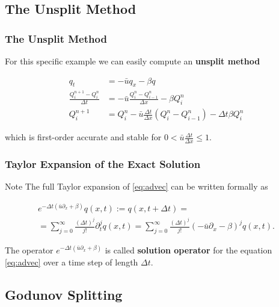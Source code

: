\documentclass{beamer}
\renewcommand{\d}{\Delta}
\newcommand{\emp}[1]{\textcolor{tum}{\textbf{#1}}}
\begin{document}
\subsection{The Unsplit Method}

\begin{frame}
	\frametitle{The Unsplit Method}
	For this specific example we can easily compute an \emp{unsplit method}

	\begin{align*}\label{eq:unsplit}
		q_t                          & = -\bar{u}q_x-\beta q                                              \\
		\frac{Q^{n+1}_i-Q^n_i}{\d t} & = -\bar{u} \frac{Q^n_i-Q^n_{i-1}}{\d x}-\beta Q^n_i                \\
		Q^{n+1}_i                    & = Q^n_i-\bar{u} \frac{\d t}{\d x}(Q^n_i-Q^n_{i-1})-\d t\beta Q^n_i
	\end{align*}

	which is first-order accurate and stable for $0<\bar{u}\frac{\d t}{\d x}\leq1$.
\end{frame}

\begin{frame}
	\frametitle{Taylor Expansion of the Exact Solution}
	\begin{block}{Note}
		The full Taylor expansion of \eqref{eq:advec} can be written formally as

		\begin{equation}\label{eq:sol_op}
			\begin{gathered}
				e^{-\d t(\bar{u}\partial_x+\beta)}q(x,t):=q(x,t+\d t)=\\
				=\sum_{j=0}^{\infty}\frac{(\d t)^j}{j!}\partial_t^jq(x,t)=\sum_{j=0}^{\infty}\frac{(\d t)^j}{j!}(-\bar{u}\partial_x-\beta)^jq(x,t).
			\end{gathered}
		\end{equation}

		The operator $e^{-\d t(\bar{u}\partial_x+\beta)}$ is called \emp{solution operator} for the equation \eqref{eq:advec} over a time step of length $\d t$.
	\end{block}
\end{frame}












\subsection{Godunov Splitting}
\end{document}
